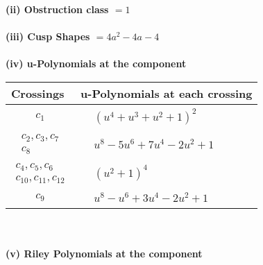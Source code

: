 \documentclass[1p]{elsarticle_modified}
\theoremstyle{definition}
\begin{document}
\flushleft \textbf{(ii) Obstruction class $= 1$}\\~\\
\flushleft \textbf{(iii) Cusp Shapes $= 4 a^2-4 a-4$}\\~\\
\newpage\renewcommand{\arraystretch}{1}
\flushleft \textbf{(iv) u-Polynomials at the component}\newline \\
\begin{tabular}{m{50pt}|m{274pt}}
Crossings & \hspace{64pt}u-Polynomials at each crossing \\
\hline $$\begin{aligned}c_{1}\end{aligned}$$&$\begin{aligned}
&(u^4+u^3+u^2+1)^2
\end{aligned}$\\
\hline $$\begin{aligned}c_{2},c_{3},c_{7}\\c_{8}\end{aligned}$$&$\begin{aligned}
&u^8-5 u^6+7 u^4-2 u^2+1
\end{aligned}$\\
\hline $$\begin{aligned}c_{4},c_{5},c_{6}\\c_{10},c_{11},c_{12}\end{aligned}$$&$\begin{aligned}
&(u^2+1)^4
\end{aligned}$\\
\hline $$\begin{aligned}c_{9}\end{aligned}$$&$\begin{aligned}
&u^8- u^6+3 u^4-2 u^2+1
\end{aligned}$\\
\hline
\end{tabular}\\~\\
\newpage\renewcommand{\arraystretch}{1}
\flushleft \textbf{(v) Riley Polynomials at the component}\newline \\
\end{document}
